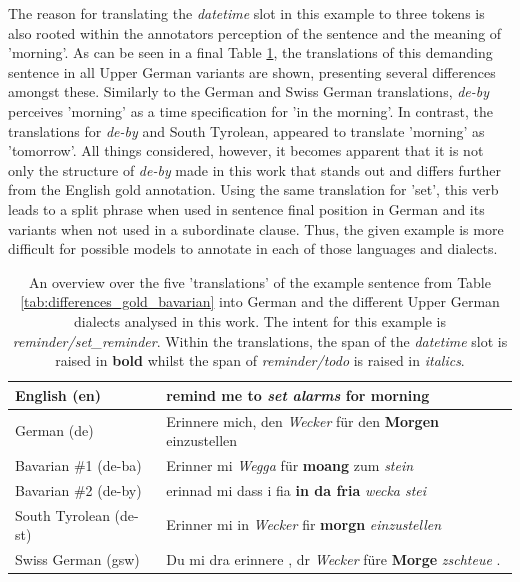\documentclass[11pt,a4paper,twoside,openright]{scrbook}
\begin{document}
The reason for translating the \textit{datetime} slot in this example to three tokens is also rooted within the annotators perception of the sentence and the meaning of 'morning'. As can be seen in a final Table \ref{tab:dialects_example_2}, the translations of this demanding sentence in all Upper German variants are shown, presenting several differences amongst these. Similarly to the German and Swiss German translations, \textit{de-by} perceives 'morning' as a time specification for 'in the morning'. In contrast, the translations for \textit{de-by} and South Tyrolean, appeared to translate 'morning' as 'tomorrow'. All things considered, however, it becomes apparent that it is not only the structure of \textit{de-by} made in this work that stands out and differs further from the English gold annotation. Using the same translation for 'set', this verb leads to a split phrase when used in sentence final position in German and its variants when not used in a subordinate clause. Thus, the given example is more difficult for possible models to annotate in each of those languages and dialects.

\begin{table}[!ht]
\centering
\begin{tabular}{l|l}
English (en)           & remind me to \textit{set alarms} for \textbf{morning}                       \\
\hline
German (de)            & Erinnere mich, den \textit{Wecker} für den \textbf{Morgen} einzustellen    \\
Bavarian \#1 (de-ba)   & Erinner mi \textit{Wegga} für \textbf{moang} zum \textit{stein}               \\
Bavarian \#2 (de-by)   & erinnad mi dass i fia \textbf{in da fria} \textit{wecka stei}              \\
South Tyrolean (de-st) & Erinner mi in \textit{Wecker} fir \textbf{morgn} \textit{einzustellen}         \\
Swiss German (gsw)     & Du mi dra erinnere , dr \textit{Wecker} füre \textbf{Morge} \textit{zschteue} .
\end{tabular}
\caption{An overview over the five 'translations' of the example sentence from Table \ref{tab:differences_gold_bavarian} into German and the different Upper German dialects analysed in this work. The intent for this example is \textit{reminder/set\_reminder}. Within the translations, the span of the \textit{datetime} slot is raised in \textbf{bold} whilst the span of \textit{reminder/todo} is raised in \textit{italics}.}
\label{tab:dialects_example_2}
\end{table}
\end{document}
